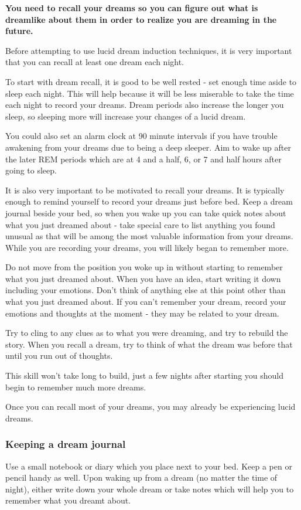 \documentclass{article}
\begin{document}
\textbf{You need to recall your dreams so you can figure out what is dreamlike about them in order to realize you are dreaming in the future.}

Before attempting to use lucid dream induction techniques, it is very important that you can recall at least one dream each night.

To start with dream recall, it is good to be well rested - set enough time aside to sleep each night. This will help because it will be less miserable to take the time each night to record your dreams. Dream periods also increase the longer you sleep, so sleeping more will increase your changes of a lucid dream.

You could also set an alarm clock at 90 minute intervals if you have trouble awakening from your dreams due to being a deep sleeper. Aim to wake up after the later REM periods which are at 4 and a half, 6, or 7 and half hours after going to sleep.

It is also very important to be motivated to recall your dreams. It is typically enough to remind yourself to record your dreams just before bed. Keep a dream journal beside your bed, so when you wake up you can take quick notes about what you just dreamed about - take special care to list anything you found unusual as that will be among the most valuable information from your dreams. While you are recording your dreams, you will likely began to remember more.

Do not move from the position you woke up in without starting to remember what you just dreamed about. When you have an idea, start writing it down including your emotions. Don't think of anything else at this point other than what you just dreamed about. If you can't remember your dream, record your emotions and thoughts at the moment - they may be related to your dream.

Try to cling to any clues as to what you were dreaming, and try to rebuild the story. When you recall a dream, try to think of what the dream was before that until you run out of thoughts.

This skill won't take long to build, just a few nights after starting you should begin to remember much more dreams.

Once you can recall most of your dreams, you may already be experiencing lucid dreams.

\subsubsection{Keeping a dream journal}
Use a small notebook or diary which you place next to your bed. Keep a pen or pencil handy as well. Upon waking up from a dream (no matter the time of night), either write down your whole dream or take notes which will help you to remember what you dreamt about.
\end{document}
